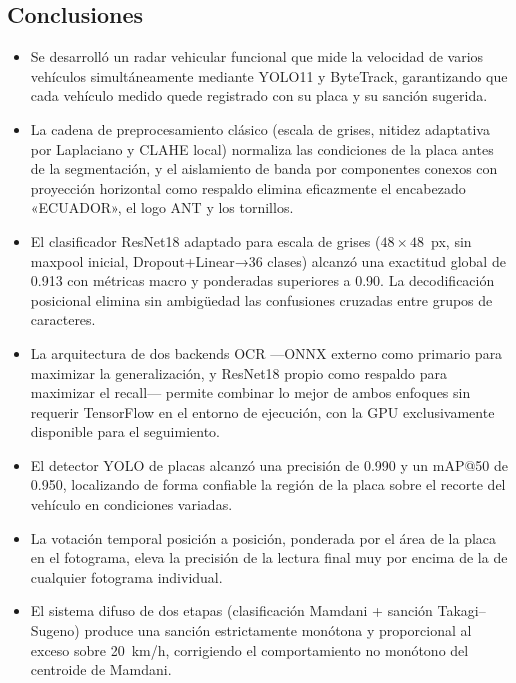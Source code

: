 \documentclass[11pt]{article}
\begin{document}
\subsection{Conclusiones}
\begin{itemize}
    \item Se desarrolló un radar vehicular funcional que mide la velocidad de varios
    vehículos simultáneamente mediante YOLO11 y ByteTrack, garantizando que cada
    vehículo medido quede registrado con su placa y su sanción sugerida.
    \item La cadena de preprocesamiento clásico (escala de grises, nitidez adaptativa
    por Laplaciano y CLAHE local) normaliza las condiciones de la placa antes de la
    segmentación, y el aislamiento de banda por componentes conexos con proyección
    horizontal como respaldo elimina eficazmente el encabezado «ECUADOR», el logo ANT
    y los tornillos.
    \item El clasificador ResNet18 adaptado para escala de grises ($48\times48$~px, sin
    maxpool inicial, Dropout+Linear→36 clases) alcanzó una exactitud global de 0.913
    con métricas macro y ponderadas superiores a 0.90. La decodificación posicional
    elimina sin ambigüedad las confusiones cruzadas entre grupos de caracteres.
    \item La arquitectura de dos backends OCR ---ONNX externo como primario para
    maximizar la generalización, y ResNet18 propio como respaldo para maximizar el
    recall--- permite combinar lo mejor de ambos enfoques sin requerir TensorFlow en
    el entorno de ejecución, con la GPU exclusivamente disponible para el seguimiento.
    \item El detector YOLO de placas alcanzó una precisión de 0.990 y un mAP@50 de
    0.950, localizando de forma confiable la región de la placa sobre el recorte del
    vehículo en condiciones variadas.
    \item La votación temporal posición a posición, ponderada por el área de la placa
    en el fotograma, eleva la precisión de la lectura final muy por encima de la de
    cualquier fotograma individual.
    \item El sistema difuso de dos etapas (clasificación Mamdani + sanción
    Takagi--Sugeno) produce una sanción estrictamente monótona y proporcional al exceso
    sobre 20~km/h, corrigiendo el comportamiento no monótono del centroide de Mamdani.
\end{itemize}
\end{document}
